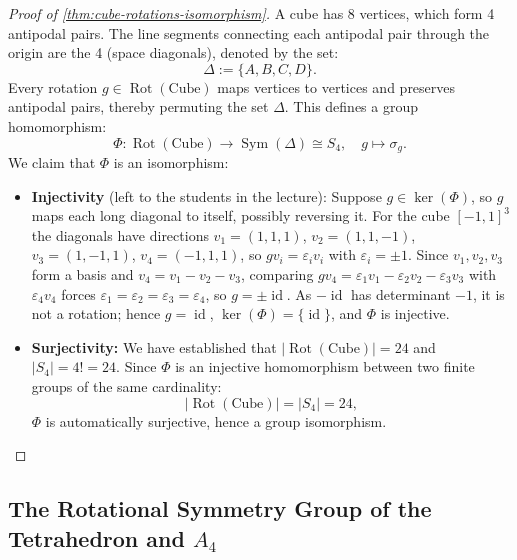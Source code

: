 \begin{content}
\begin{proof}[Proof of \cref{thm:cube-rotations-isomorphism}]
A cube has 8 vertices, which form 4 antipodal pairs. The line segments connecting each antipodal pair through the origin are the 4  (space diagonals), denoted by the set:
\[
\Delta := \{A, B, C, D\}.
\]
Every rotation $g \in \operatorname{Rot}(\text{Cube})$ maps vertices to vertices and preserves antipodal pairs, thereby permuting the set $\Delta$. This defines a group homomorphism:
\[
\Phi \colon \operatorname{Rot}(\text{Cube}) \to \operatorname{Sym}(\Delta) \cong S_4, \quad g \mapsto \sigma_g.
\]
We claim that $\Phi$ is an isomorphism:
\begin{itemize}
    \item \textbf{Injectivity} (left to the students in the lecture):
    Suppose $g \in \ker(\Phi)$, so $g$ maps each long diagonal to itself, possibly reversing it. For the cube $[-1, 1]^3$ the diagonals have directions $v_1 = (1, 1, 1)$, $v_2 = (1, 1, -1)$, $v_3 = (1, -1, 1)$, $v_4 = (-1, 1, 1)$, so $g v_i = \varepsilon_i v_i$ with $\varepsilon_i = \pm 1$. Since $v_1, v_2, v_3$ form a basis and $v_4 = v_1 - v_2 - v_3$, comparing $g v_4 = \varepsilon_1 v_1 - \varepsilon_2 v_2 - \varepsilon_3 v_3$ with $\varepsilon_4 v_4$ forces $\varepsilon_1 = \varepsilon_2 = \varepsilon_3 = \varepsilon_4$, so $g = \pm \operatorname{id}$. As $-\operatorname{id}$ has determinant $-1$, it is not a rotation; hence $g = \operatorname{id}$, $\ker(\Phi) = \{\operatorname{id}\}$, and $\Phi$ is injective.
    \item \textbf{Surjectivity:}
    We have established that $|\operatorname{Rot}(\text{Cube})| = 24$ and $|S_4| = 4! = 24$. Since $\Phi$ is an injective homomorphism between two finite groups of the same cardinality:
    \[
    |\operatorname{Rot}(\text{Cube})| = |S_4| = 24,
    \]
    $\Phi$ is automatically surjective, hence a group isomorphism. \qedhere
\end{itemize}
\end{proof}
\end{content}

\subsection{The Rotational Symmetry Group of the Tetrahedron and \texorpdfstring{$A_4$}{A4}}

